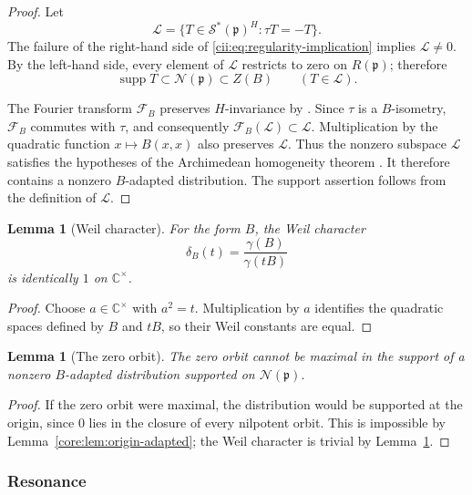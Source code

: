 \documentclass[10pt,a4paper]{amsart}
\numberwithin{equation}{section}
\newtheorem{lemma}[theorem]{Lemma}
\newcommand{\C}{\mathbb C}
\newcommand{\supp}{\operatorname{supp}}
\newcommand{\cN}{\mathcal N}
\newcommand{\cS}{\mathcal S}
\begin{document}
\begin{proof}
Let
\[
\mathcal L
=
\{T\in\cS^*(\mathfrak p)^H:\tau T=-T\}.
\]
The failure of the right-hand side of
\eqref{cii:eq:regularity-implication} implies \(\mathcal L\neq0\).
By the left-hand side, every element of \(\mathcal L\) restricts to zero
on \(R(\mathfrak p)\); therefore
\[
\supp T\subset\cN(\mathfrak p)\subset Z(B)
\qquad(T\in\mathcal L).
\]

The Fourier transform \(\mathcal F_B\) preserves \(H\)-invariance by
\cite[Lemma~5.1.8]{AG09}.  Since \(\tau\) is a \(B\)-isometry,
\(\mathcal F_B\) commutes with \(\tau\), and consequently
\(\mathcal F_B(\mathcal L)\subset\mathcal L\).
Multiplication by the quadratic function \(x\mapsto B(x,x)\) also
preserves \(\mathcal L\).  Thus the nonzero subspace \(\mathcal L\)
satisfies the hypotheses of the Archimedean homogeneity theorem
\cite[Theorem~5.1.7]{AG09}.  It therefore contains a nonzero
\(B\)-adapted distribution.  The support assertion follows from the
definition of \(\mathcal L\).
\end{proof}

\begin{lemma}[Weil character]\label{cii:lem:weil-trivial}
For the form \(B\), the Weil character
\[
\delta_B(t)=\frac{\gamma(B)}{\gamma(tB)}
\]
is identically \(1\) on \(\C^\times\).
\end{lemma}

\begin{proof}
Choose \(a\in\C^\times\) with \(a^2=t\).  Multiplication by \(a\) identifies
the quadratic spaces defined by \(B\) and \(tB\), so their Weil constants
are equal.
\end{proof}

\begin{lemma}[The zero orbit]\label{cii:lem:zero-orbit}
The zero orbit cannot be maximal in the support of a nonzero
$B$-adapted distribution supported on $\cN(\mathfrak p)$.
\end{lemma}

\begin{proof}
If the zero orbit were maximal, the distribution would be supported at the
origin, since $0$ lies in the closure of every nilpotent orbit.  This is
impossible by Lemma~\ref{core:lem:origin-adapted}; the Weil character is
trivial by Lemma~\ref{cii:lem:weil-trivial}.
\end{proof}

\subsubsection{Resonance}
\end{document}
